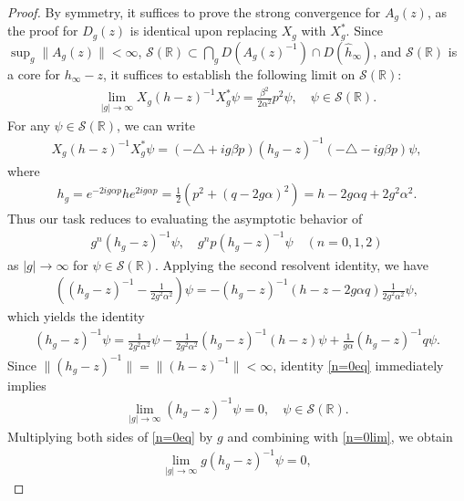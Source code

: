 \documentclass[12pt,dvipdfmx]{article}
\newcommand{\RR}{\mathbb{R}}
\begin{document}
\begin{proof}
By symmetry, it suffices to prove the strong convergence for $A_g(z)$, as the proof for $D_g(z)$ is identical upon replacing $X_g$ with $X_g^\ast$.
Since $\sup_{g} \| A_g(z) \| < \infty$, ${\mathscr S}(\RR) \subset \bigcap_g D(A_g(z)^{-1}) \cap D(\hat{h}_\infty)$, and ${\mathscr S}(\RR)$ is a core for $h_{\infty} - z$, it suffices to establish the following limit on ${\mathscr S}(\RR)$:
\begin{align*}
    \lim_{|g|\to\infty} X_g (h - z)^{-1} X_g^\ast \psi 
    = \frac{\beta^2}{2\alpha^2} p^2 \psi, 
    \quad \psi \in {\mathscr S}(\RR).
\end{align*}
For any $\psi \in {\mathscr S}(\RR)$, we can write
\begin{align*}
    X_g (h - z)^{-1} X_g^\ast \psi
    = (-\triangle + ig\beta p) (h_g - z)^{-1} (-\triangle - ig\beta p) \psi,
\end{align*}
where 
\begin{align}h_g = e^{-2ig\alpha p} h e^{2ig\alpha p} = \frac12 (p^2 + (q - 2g\alpha)^2) = h - 2g\alpha q + 2g^2\alpha^2.\end{align} 
Thus our task reduces to evaluating the asymptotic behavior of
\begin{align*}
    g^n (h_g - z)^{-1}\psi, \quad g^n p (h_g - z)^{-1} \psi \quad (n = 0, 1, 2)
\end{align*}
as $|g| \to \infty$ for $\psi \in {\mathscr S}(\RR)$. Applying the second resolvent identity, we have
\begin{align*}
    \left( (h_g - z)^{-1} - \frac{1}{2g^2\alpha^2} \right) \psi
    = -(h_g - z)^{-1} (h - z - 2g\alpha q) \frac{1}{2g^2\alpha^2} \psi,
\end{align*}
which yields the identity
\begin{align}\label{n=0eq}
    (h_g - z)^{-1} \psi
    = \frac{1}{2g^2\alpha^2} \psi 
    - \frac{1}{2g^2\alpha^2} (h_g - z)^{-1} (h - z) \psi
    + \frac{1}{g\alpha} (h_g - z)^{-1} q\psi.
\end{align}
Since $\| (h_g - z)^{-1} \| = \| (h - z)^{-1} \| < \infty$, identity \eqref{n=0eq} immediately implies
\begin{align}\label{n=0lim}
    \lim_{|g|\to\infty} (h_g - z)^{-1} \psi = 0, 
    \quad 
    \psi \in {\mathscr S}(\RR).
\end{align}
Multiplying both sides of \eqref{n=0eq} by $g$ and combining with \eqref{n=0lim}, we obtain
\begin{align}\label{n=1lim}
    \lim_{|g|\to\infty} g (h_g - z)^{-1} \psi = 0, 

\end{align}
\end{proof}
\end{document}
